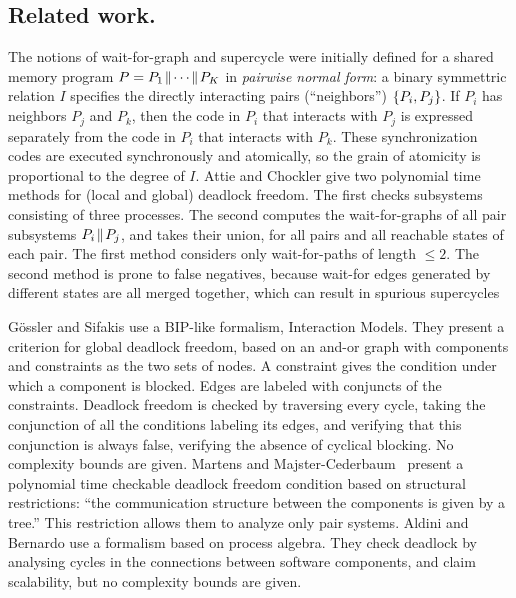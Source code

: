 
\subsection{Related work.} 
The notions of wait-for-graph and supercycle \cite{AC05,AE98}
were initially defined for a shared memory program
$P = P_1 \!\parallel\! \cdots \!\parallel\! P_K$ in \emph{pairwise normal form}: a binary
symmettric relation $I$ specifies the directly interacting pairs
(``neighbors'') $\{ P_i, P_j \}$.
If $P_i$ has neighbors $P_j$ and $P_k$, then 
the code in $P_i$ that interacts with $P_j$ is expressed separately from
the code in $P_i$ that interacts with $P_k$. 
These synchronization codes are executed synchronously and
atomically, so the grain of atomicity is proportional to the
degree of $I$.
%
Attie and Chockler \cite{AC05} give two polynomial time 
methods for (local and global) deadlock freedom.
The first checks subsystems consisting of three
processes. The second computes the wait-for-graphs of all pair subsystems $P_i \!\parallel\! P_j$,
and takes their union, for all pairs
and all reachable states of each pair.
The first method considers only wait-for-paths of length $\le 2$. 
The second method is prone to false negatives,
because wait-for edges generated by different states are
all merged together, which can result in spurious supercycles


G{\"o}ssler and Sifakis \cite{GS03} use a BIP-like
formalism, Interaction Models. %
They present a criterion for global deadlock freedom, based on 
an and-or graph with components and constraints as the two sets of nodes. A
constraint gives the condition
under which a component is blocked. Edges are labeled with conjuncts
of the constraints.  Deadlock freedom is checked by traversing every
cycle, taking the conjunction of all the
conditions labeling its edges, and verifying that this conjunction is
always false, \ie verifying the absence of cyclical blocking.
No complexity bounds are given.
%
Martens and Majster-Cederbaum~\cite{MM12} present a polynomial time
checkable deadlock freedom condition based on structural restrictions:
``the communication structure between the components is given by a
tree.'' This restriction allows them to analyze only pair systems.
%
Aldini and Bernardo \cite{AB03} use a 
formalism based on process algebra. They check deadlock by analysing cycles in
the connections between software components, and claim scalability, but no
complexity bounds are given.

